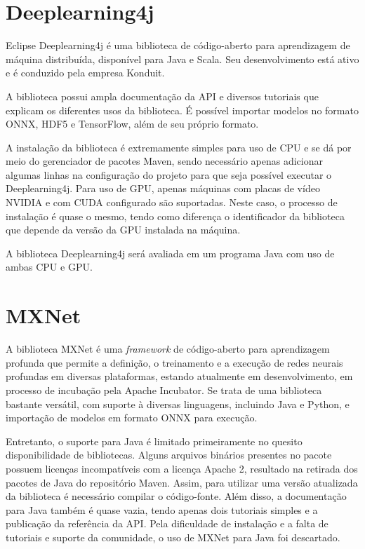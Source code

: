\section{Deeplearning4j}

Eclipse Deeplearning4j \cite{ml_site_deeplearning4j} é uma biblioteca de código-aberto para aprendizagem de máquina distribuída, disponível para Java e Scala. Seu desenvolvimento está ativo e é conduzido pela empresa Konduit.

A biblioteca possui ampla documentação da \acrshort{API} e diversos tutoriais que explicam os diferentes usos da biblioteca. É possível importar modelos no formato ONNX, HDF5 e TensorFlow, além de seu próprio formato.

A instalação da biblioteca é extremamente simples para uso de CPU e se dá por meio do gerenciador de pacotes Maven, sendo necessário apenas adicionar algumas linhas na configuração do projeto para que seja possível executar o Deeplearning4j. Para uso de GPU, apenas máquinas com placas de vídeo NVIDIA e com \acrshort{CUDA} configurado são suportadas. Neste caso, o processo de instalação é quase o mesmo, tendo como diferença o identificador da biblioteca que depende da versão da GPU instalada na máquina.

A biblioteca Deeplearning4j será avaliada em um programa Java com uso de ambas CPU e GPU.

\section{MXNet}

A biblioteca MXNet \cite{ml_site_mxnet} é uma \textit{framework} de código-aberto para aprendizagem profunda que permite a definição, o treinamento e a execução de redes neurais profundas em diversas plataformas, estando atualmente em desenvolvimento, em processo de incubação pela Apache Incubator. Se trata de uma biblioteca bastante versátil, com suporte à diversas linguagens, incluindo Java e Python, e importação de modelos em formato ONNX para execução.

Entretanto, o suporte para Java é limitado primeiramente no quesito disponibilidade de bibliotecas. Alguns arquivos binários presentes no pacote possuem licenças incompatíveis com a licença Apache 2, resultado na retirada dos pacotes de Java do repositório Maven. Assim, para utilizar uma versão atualizada da biblioteca é necessário compilar o código-fonte. Além disso, a documentação para Java também é quase vazia, tendo apenas dois tutoriais simples e a publicação da referência da API. Pela dificuldade de instalação e a falta de tutoriais e suporte da comunidade, o uso de MXNet para Java foi descartado.

